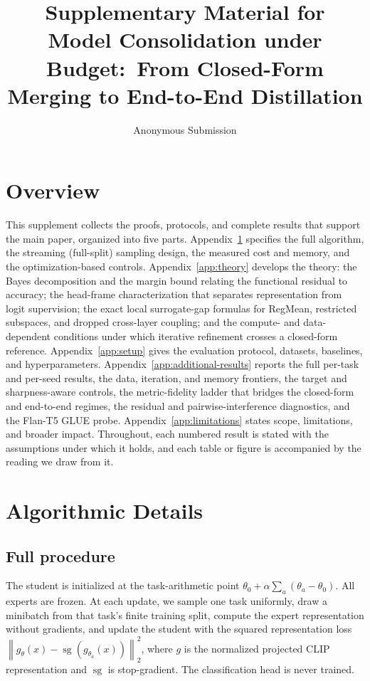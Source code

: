 \documentclass[letterpaper]{article} %
\title{Supplementary Material for\\
Model Consolidation under Budget:\ From Closed-Form Merging to End-to-End Distillation}
\author{Anonymous Submission}
\newcommand{\norm}[1]{\left\lVert #1\right\rVert}
\theoremstyle{plain}
\theoremstyle{definition}
\begin{document}
\maketitle
\appendix

\section*{Overview}
This supplement collects the proofs, protocols, and complete results that support the main paper, organized into five parts.
Appendix~\ref{app:algorithm} specifies the full algorithm, the streaming (full-split) sampling design, the measured cost and memory, and the optimization-based controls.
Appendix~\ref{app:theory} develops the theory: the Bayes decomposition and the margin bound relating the functional residual to accuracy; the head-frame characterization that separates representation from logit supervision; the exact local surrogate-gap formulas for RegMean, restricted subspaces, and dropped cross-layer coupling; and the compute- and data-dependent conditions under which iterative refinement crosses a closed-form reference.
Appendix~\ref{app:setup} gives the evaluation protocol, datasets, baselines, and hyperparameters.
Appendix~\ref{app:additional-results} reports the full per-task and per-seed results, the data, iteration, and memory frontiers, the target and sharpness-aware controls, the metric-fidelity ladder that bridges the closed-form and end-to-end regimes, the residual and pairwise-interference diagnostics, and the Flan-T5 GLUE probe.
Appendix~\ref{app:limitations} states scope, limitations, and broader impact.
Throughout, each numbered result is stated with the assumptions under which it holds, and each table or figure is accompanied by the reading we draw from it.

\section{Algorithmic Details}
\label{app:algorithm}

\subsection{Full procedure}
The student is initialized at the task-arithmetic point $\theta_0+\alpha\sum_a(\theta_a-\theta_0)$.
All experts are frozen.
At each update, we sample one task uniformly, draw a minibatch from that task's finite training split, compute the expert representation without gradients, and update the student with the squared representation loss $\norm{g_\theta(x)-\operatorname{sg}(g_{\theta_a}(x))}_2^2$, where $g$ is the normalized projected CLIP representation and $\operatorname{sg}$ is stop-gradient.
The classification head is never trained.
\end{document}
